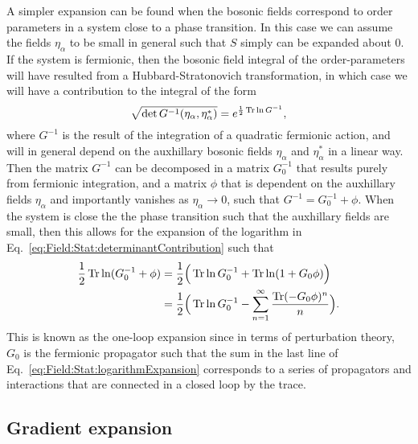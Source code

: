 A simpler expansion can be found when the bosonic fields correspond to order parameters in a system close to a phase transition. In this case
we can assume the fields $\eta_\alpha$ to be small in general such that $S$ simply can be expanded about $0$. If the system is fermionic, then
the bosonic field integral of the order-parameters will have resulted from a Hubbard-Stratonovich transformation, in which case we will have
a contribution to the integral of the form
\begin{equation}
    \label{eq:Field:Stat:determinantContribution}
    \sqrt{\det G^{-1}(\eta_\alpha,\eta_\alpha^\ast)} = e^{\frac{1}{2}\operatorname{Tr}\ln G^{-1}},
\end{equation}
where $G^{-1}$ is the result of the integration of a quadratic fermionic action, and will in general depend on the auxhillary bosonic fields
$\eta_\alpha$ and $\eta_\alpha^\ast$ in a linear way. Then the matrix $G^{-1}$ can be decomposed in a matrix $G_0^{-1}$ that results purely
from fermionic integration, and a matrix $\phi$ that is dependent on the auxhillary fields $\eta_\alpha$ and importantly vanishes as $\eta_\alpha\to0$,
such that $G^{-1} = G_0^{-1} + \phi$. When the system is close the the phase transition such that the auxhillary fields are small, then this
allows for the expansion of the logarithm in Eq.~\eqref{eq:Field:Stat:determinantContribution} such that
\begin{equation}
    \label{eq:Field:Stat:logarithmExpansion}
    \begin{split}
        \frac{1}{2}\operatorname{Tr}\ln(G_0^{-1} + \phi) &= \frac{1}{2}\Big(\operatorname{Tr}\ln G_0^{-1} + \operatorname{Tr}\ln(1+G_0\phi)\Big)\\
        &= \frac{1}{2}\Big(\operatorname{Tr}\ln G_0^{-1} - \sum_{n=1}^\infty\frac{\operatorname{Tr} (-G_0\phi)^n}{n}\Big).
    \end{split}
\end{equation}
This is known as the one-loop expansion since in terms of perturbation theory, $G_0$ is the fermionic propagator such that the sum in the
last line of Eq.~\eqref{eq:Field:Stat:logarithmExpansion} corresponds to a series of propagators and interactions that are connected in
a closed loop by the trace.

\subsection{Gradient expansion}

